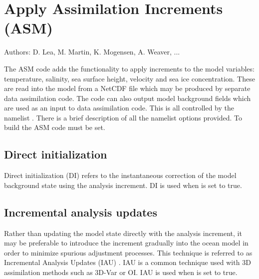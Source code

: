 \documentclass[../main/NEMO_manual]{subfiles}
\begin{document}
\chapter{Apply Assimilation Increments (ASM)}
\label{chap:ASM}

Authors: D. Lea,  M. Martin, K. Mogensen, A. Weaver, ...   %

\minitoc

\newpage

The ASM code adds the functionality to apply increments to the model variables: temperature, salinity,
sea surface height, velocity and sea ice concentration. 
These are read into the model from a NetCDF file which may be produced by separate data assimilation code.
The code can also output model background fields which are used as an input to data assimilation code.
This is all controlled by the namelist \textit{ }.
There is a brief description of all the namelist options provided.
To build the ASM code  must be set.


\section{Direct initialization}
\label{sec:ASM_DI}

Direct initialization (DI) refers to the instantaneous correction of the model background state using
the analysis increment.
DI is used when  is set to true.

\section{Incremental analysis updates}
\label{sec:ASM_IAU}

Rather than updating the model state directly with the analysis increment,
it may be preferable to introduce the increment gradually into the ocean model in order to
minimize spurious adjustment processes.
This technique is referred to as Incremental Analysis Updates (IAU) \citep{Bloom_al_MWR96}.
IAU is a common technique used with 3D assimilation methods such as 3D-Var or OI.
IAU is used when  is set to true.
\end{document}
